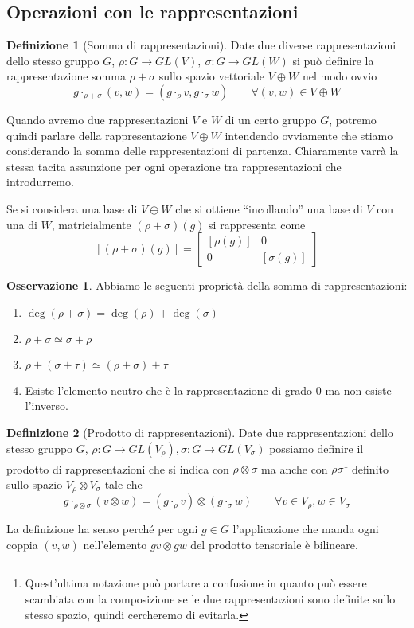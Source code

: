 \documentclass[11pt]{article}
\theoremstyle{plain}
\theoremstyle{definition}
\newtheorem{defn}{Definizione}[section]
\newtheorem*{rem}{Osservazione}
\theoremstyle{remark}
\DeclareMathOperator{\iso}{\simeq}
\begin{document}
\subsection{Operazioni con le rappresentazioni}
\begin{defn}[Somma di rappresentazioni]
\label{defn:somma di rappresentazioni}
Date due diverse rappresentazioni dello stesso gruppo $G$, $\rho: G \to GL(V), \ \sigma: G \to GL(W)$ si può definire la rappresentazione somma $\rho + \sigma$ sullo spazio vettoriale $V \oplus W$ nel modo ovvio
\[ g\cdot_{\rho + \sigma} (v,w) = (g\cdot_\rho v, g\cdot_\sigma w) \qquad \forall (v,w) \in V\oplus W \]
\end{defn}
Quando avremo due rappresentazioni $V$ e $W$ di un certo gruppo $G$, potremo quindi parlare della rappresentazione $V\oplus W$ intendendo ovviamente che
stiamo considerando la somma delle rappresentazioni di partenza.
Chiaramente varrà la stessa tacita assunzione per ogni operazione tra rappresentazioni che introdurremo.

Se si considera una base di $V\oplus W$ che si ottiene ``incollando'' una base di $V$ con una di $W$, matricialmente $(\rho+\sigma)(g)$ si rappresenta come
\[ [(\rho+\sigma)(g)]= \begin{bmatrix}
[\rho(g)] & 0\\
0 & [\sigma(g)]
\end{bmatrix} \]

\begin{rem}
Abbiamo le seguenti proprietà della somma di rappresentazioni:
\begin{enumerate}
\item $\deg(\rho+\sigma)=\deg(\rho)+\deg(\sigma)$
\item $\rho + \sigma \iso \sigma + \rho$
\item $\rho + (\sigma + \tau) \iso (\rho + \sigma ) + \tau$
\item Esiste l'elemento neutro che è la rappresentazione di grado 0 ma non esiste l'inverso.
\end{enumerate}
\end{rem}




\begin{defn}[Prodotto di rappresentazioni]
\label{defn:prodotto di rappresentazioni}
  Date due rappresentazioni dello stesso gruppo $G$, $\rho: G \to GL(V_\rho), \sigma: G \to GL(V_\sigma)$ possiamo definire il prodotto di rappresentazioni che si indica con $\rho \otimes \sigma$  ma anche con $\rho\sigma$\footnote{Quest'ultima notazione può portare a confusione in quanto può essere scambiata con la composizione se le due rappresentazioni sono definite sullo stesso spazio, quindi cercheremo di evitarla.} definito sullo spazio $V_\rho \otimes V_\sigma$ tale che
  \[ g\cdot_{\rho \otimes \sigma}(v \otimes w) = (g\cdot_\rho v) \otimes (g\cdot_\sigma w) \qquad \forall v \in V_\rho, w \in V_\sigma\]
\end{defn}
La definizione ha senso perché per ogni $g\in G$ l'applicazione che manda ogni coppia $(v,w)$ nell'elemento $gv\otimes gw$ del prodotto tensoriale è bilineare.
\end{document}
